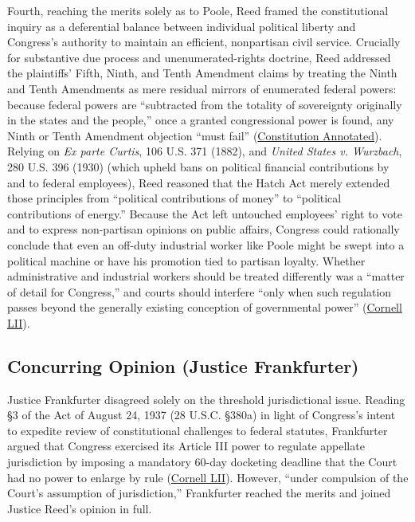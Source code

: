 \documentclass[12pt]{article}
\begin{document}
Fourth, reaching the merits solely as to Poole, Reed framed the constitutional inquiry as a deferential balance between individual political liberty and Congress's authority to maintain an efficient, nonpartisan civil service. Crucially for substantive due process and unenumerated-rights doctrine, Reed addressed the plaintiffs' Fifth, Ninth, and Tenth Amendment claims by treating the Ninth and Tenth Amendments as mere residual mirrors of enumerated federal powers: because federal powers are ``subtracted from the totality of sovereignty originally in the states and the people,'' once a granted congressional power is found, any Ninth or Tenth Amendment objection ``must fail'' (\href{https://constitution.congress.gov/browse/essay/amdt9-3/ALDE_00013643/}{Constitution Annotated}). Relying on \textit{Ex parte Curtis}, 106 U.S. 371 (1882), and \textit{United States v. Wurzbach}, 280 U.S. 396 (1930) (which upheld bans on political financial contributions by and to federal employees), Reed reasoned that the Hatch Act merely extended those principles from ``political contributions of money'' to ``political contributions of energy.'' Because the Act left untouched employees' right to vote and to express non-partisan opinions on public affairs, Congress could rationally conclude that even an off-duty industrial worker like Poole might be swept into a political machine or have his promotion tied to partisan loyalty. Whether administrative and industrial workers should be treated differently was a ``matter of detail for Congress,'' and courts should interfere ``only when such regulation passes beyond the generally existing conception of governmental power'' (\href{https://www.law.cornell.edu/supremecourt/text/330/75}{Cornell LII}).

\subsection{Concurring Opinion (Justice Frankfurter)}

Justice Frankfurter disagreed solely on the threshold jurisdictional issue. Reading \S 3 of the Act of August 24, 1937 (28 U.S.C. \S 380a) in light of Congress's intent to expedite review of constitutional challenges to federal statutes, Frankfurter argued that Congress exercised its Article III power to regulate appellate jurisdiction by imposing a mandatory 60-day docketing deadline that the Court had no power to enlarge by rule (\href{https://www.law.cornell.edu/supremecourt/text/330/75}{Cornell LII}). However, ``under compulsion of the Court's assumption of jurisdiction,'' Frankfurter reached the merits and joined Justice Reed's opinion in full.
\end{document}
